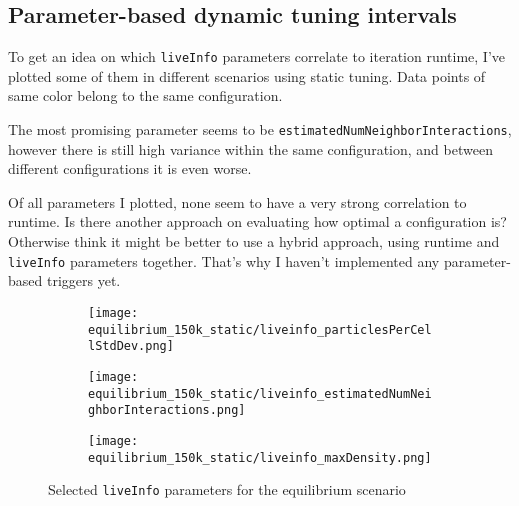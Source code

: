 \documentclass[]{article}
\begin{document}
\subsection{Parameter-based dynamic tuning intervals}
To get an idea on which \texttt{liveInfo} parameters correlate to iteration runtime, I've plotted some of them in different scenarios using static tuning. Data points of same color belong to the same configuration.

The most promising parameter seems to be \texttt{estimatedNumNeighborInteractions}, however there is still high variance within the same configuration, and between different configurations it is even worse.

Of all parameters I plotted, none seem to have a very strong correlation to runtime. Is there another approach on evaluating how optimal a configuration is? Otherwise think it might be better to use a hybrid approach, using runtime and \texttt{liveInfo} parameters together. That's why I haven't implemented any parameter-based triggers yet.


\begin{figure}[htpb]
	\begin{center}
		\begin{subfigure}[t]{0.3\textwidth}
			\texttt{[image: equilibrium\_150k\_static/liveinfo\_particlesPerCellStdDev.png]}
		\end{subfigure}
		\begin{subfigure}[t]{0.3\textwidth}
			\texttt{[image: equilibrium\_150k\_static/liveinfo\_estimatedNumNeighborInteractions.png]}
		\end{subfigure}
		\begin{subfigure}[t]{0.3\textwidth}
			\texttt{[image: equilibrium\_150k\_static/liveinfo\_maxDensity.png]}
		\end{subfigure}
	\end{center}
	\label{fig_equil_liveinfo}
	\caption{Selected \texttt{liveInfo} parameters for the equilibrium scenario}
\end{figure}
\end{document}

